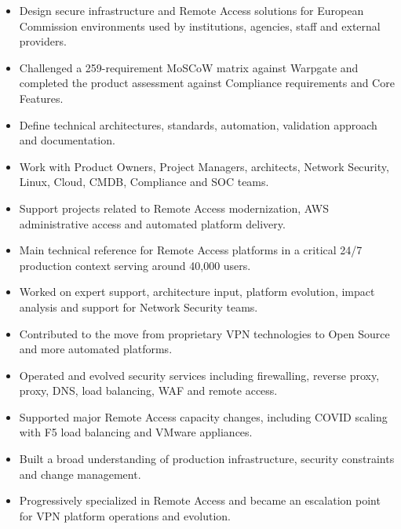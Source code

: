 
\begin{itemize}
  \item Design secure infrastructure and Remote Access solutions for European Commission environments used by institutions, agencies, staff and external providers.
  \item Challenged a 259-requirement MoSCoW matrix against Warpgate and completed the product assessment against Compliance requirements and Core Features.
  \item Define technical architectures, standards, automation, validation approach and documentation.
  \item Work with Product Owners, Project Managers, architects, Network Security, Linux, Cloud, CMDB, Compliance and SOC teams.
  \item Support projects related to Remote Access modernization, AWS administrative access and automated platform delivery.
\end{itemize}

\begin{itemize}
  \item Main technical reference for Remote Access platforms in a critical 24/7 production context serving around 40,000 users.
  \item Worked on expert support, architecture input, platform evolution, impact analysis and support for Network Security teams.
  \item Contributed to the move from proprietary VPN technologies to Open Source and more automated platforms.
\end{itemize}

\begin{itemize}
  \item Operated and evolved security services including firewalling, reverse proxy, proxy, DNS, load balancing, WAF and remote access.
  \item Supported major Remote Access capacity changes, including COVID scaling with F5 load balancing and VMware appliances.
  \item Built a broad understanding of production infrastructure, security constraints and change management.
  \item Progressively specialized in Remote Access and became an escalation point for VPN platform operations and evolution.
\end{itemize}
